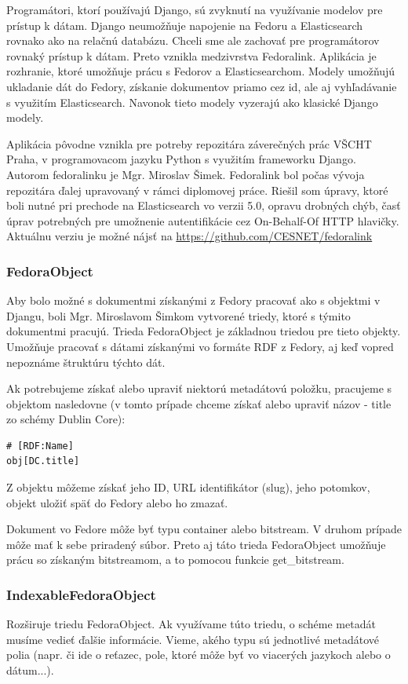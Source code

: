 \documentclass[thesis=M,slovak]{FITthesis}[2013/05/06]
\begin{document}
Programátori, ktorí používajú Django, sú zvyknutí na využívanie modelov pre prístup k dátam. Django neumožňuje napojenie na Fedoru a Elasticsearch rovnako ako na relačnú databázu. Chceli sme ale zachovať pre programátorov rovnaký prístup k dátam. Preto vznikla medzivrstva Fedoralink. Aplikácia je rozhranie, ktoré umožňuje prácu s Fedorov a Elasticsearchom. Modely umožňujú ukladanie dát do Fedory, získanie dokumentov priamo cez id, ale aj vyhľadávanie s využitím Elasticsearch. Navonok tieto modely vyzerajú ako klasické Django modely.

Aplikácia pôvodne vznikla pre potreby repozitára záverečných prác VŠCHT Praha, v programovacom jazyku Python s využitím frameworku Django. Autorom fedoralinku je Mgr. Miroslav Šimek. Fedoralink bol počas vývoja repozitára ďalej upravovaný v rámci diplomovej práce. Riešil som úpravy, ktoré boli nutné pri prechode na Elasticsearch vo verzii 5.0, opravu drobných chýb, časť úprav potrebných pre umožnenie autentifikácie cez On-Behalf-Of HTTP hlavičky. Aktuálnu verziu je možné nájsť na \url{https://github.com/CESNET/fedoralink}

\subsubsection{FedoraObject}
Aby bolo možné s dokumentmi získanými z Fedory pracovať ako s objektmi v Djangu, boli Mgr. Miroslavom Šimkom vytvorené triedy, ktoré s týmito dokumentmi pracujú. Trieda FedoraObject je základnou triedou pre tieto objekty. Umožňuje pracovať s dátami získanými vo formáte RDF z Fedory, aj keď vopred nepoznáme štruktúru týchto dát.

Ak potrebujeme získať alebo upraviť niektorú metadátovú položku, pracujeme s objektom nasledovne (v tomto prípade chceme získať alebo upraviť názov - title zo schémy Dublin Core): 
\begin{lstlisting}[frame=single] 
# [RDF:Name]
obj[DC.title]
\end{lstlisting}

Z objektu môžeme získať jeho ID, URL identifikátor (slug), jeho potomkov, objekt uložiť späť do Fedory alebo ho zmazať.

Dokument vo Fedore môže byť typu container alebo bitstream. V druhom prípade môže mať k sebe priradený súbor. Preto aj táto trieda FedoraObject umožňuje prácu so získaným bitstreamom, a to pomocou funkcie get\_bitstream.

\subsubsection{IndexableFedoraObject}
Rozširuje triedu FedoraObject. Ak využívame túto triedu, o schéme metadát musíme vedieť ďalšie informácie. Vieme, akého typu sú jednotlivé metadátové polia (napr. či ide o reťazec, pole, ktoré môže byť vo viacerých jazykoch alebo o dátum...).
\end{document}
